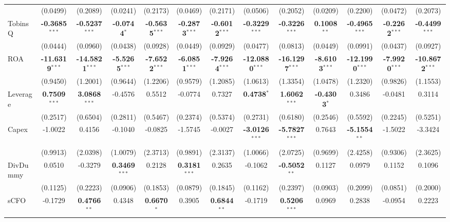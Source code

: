 \begin{landscape}
\begin{table}[H]
\begin{tabular}{lcccccccccccc}
 & (0.0499) & (0.2089) & (0.0241) & (0.2173) & (0.0469) & (0.2171) & (0.0506) & (0.2052) & (0.0209) & (0.2200) & (0.0472) & (0.2073) \\
TobinsQ & \textbf{-0.3685}$^{***}$ & \textbf{-0.5237}$^{***}$ & \textbf{-0.0744}$^{*}$ & \textbf{-0.5635}$^{***}$ & \textbf{-0.2873}$^{***}$ & \textbf{-0.6012}$^{***}$ & \textbf{-0.3229}$^{***}$ & \textbf{-0.3226}$^{***}$ & \textbf{0.1008}$^{**}$ & \textbf{-0.4965}$^{***}$ & \textbf{-0.2262}$^{***}$ & \textbf{-0.4499}$^{***}$ \\
 & (0.0444) & (0.0960) & (0.0438) & (0.0928) & (0.0449) & (0.0929) & (0.0477) & (0.0813) & (0.0449) & (0.0991) & (0.0437) & (0.0927) \\
ROA & \textbf{-11.6319}$^{***}$ & \textbf{-14.5821}$^{***}$ & \textbf{-5.5265}$^{***}$ & \textbf{-7.6522}$^{***}$ & \textbf{-6.0851}$^{***}$ & \textbf{-7.9264}$^{***}$ & \textbf{-12.0880}$^{***}$ & \textbf{-16.1297}$^{***}$ & \textbf{-8.6103}$^{***}$ & \textbf{-12.1990}$^{***}$ & \textbf{-7.9920}$^{***}$ & \textbf{-10.8672}$^{***}$ \\
 & (0.9450) & (1.2001) & (0.9644) & (1.2206) & (0.9579) & (1.2085) & (1.0613) & (1.3354) & (1.0478) & (1.2320) & (0.9826) & (1.1553) \\
Leverage & \textbf{0.7509}$^{***}$ & \textbf{3.0868}$^{***}$ & -0.4576 & 0.5512 & -0.0774 & 0.7327 & \textbf{0.4738}$^{*}$ & \textbf{1.6062}$^{***}$ & \textbf{-0.4303}$^{*}$ & 0.3486 & -0.0481 & 0.3114 \\
 & (0.2517) & (0.6504) & (0.2811) & (0.5467) & (0.2374) & (0.5374) & (0.2731) & (0.6180) & (0.2546) & (0.5592) & (0.2245) & (0.5251) \\
Capex & -1.0022 & 0.4156 & -0.1040 & -0.0825 & -1.5745 & -0.0027 & \textbf{-3.0126}$^{***}$ & \textbf{-5.7827}$^{***}$ & 0.7643 & \textbf{-5.1554}$^{**}$ & -1.5022 & -3.3424 \\
 & (0.9913) & (2.0398) & (1.0079) & (2.3713) & (0.9891) & (2.3137) & (1.0066) & (2.0725) & (0.9699) & (2.4258) & (0.9306) & (2.3625) \\
DivDummy & 0.0510 & -0.3279 & \textbf{0.3469}$^{***}$ & 0.2128 & \textbf{0.3181}$^{***}$ & 0.2635 & -0.1062 & \textbf{-0.5052}$^{**}$ & 0.1127 & 0.0979 & 0.1152 & 0.1096 \\
 & (0.1125) & (0.2223) & (0.0906) & (0.1853) & (0.0879) & (0.1845) & (0.1162) & (0.2397) & (0.0903) & (0.2099) & (0.0851) & (0.2000) \\
sCFO & -0.1729 & \textbf{0.4766}$^{**}$ & 0.4348 & \textbf{0.6670}$^{*}$ & 0.3905 & \textbf{0.6844}$^{**}$ & -0.1719 & \textbf{0.5206}$^{***}$ & 0.0969 & 0.2838 & -0.0954 & 0.2223 \\

\end{tabular}
\end{table}
\end{landscape}
